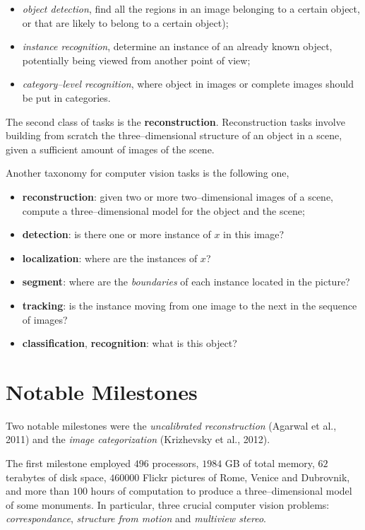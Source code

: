 \documentclass[10pt]{report}
\begin{document}
\begin{itemize}
\item \emph{object detection}, find all the regions in an image belonging to a certain object, or that are likely to belong to a certain object);
\item \emph{instance recognition}, determine an instance of an already known object, potentially being viewed from another point of view;
\item \emph{category--level recognition}, where object in images or complete images should be put in categories.
\end{itemize}

The second class of tasks is the \textbf{reconstruction}. Reconstruction tasks involve
building from scratch the three--dimensional structure of an object in a scene,
given a sufficient amount of images of the scene.

Another taxonomy for computer vision tasks is the following one,

\begin{itemize}
\item \textbf{reconstruction}: given two or more two--dimensional images of a scene, compute a three--dimensional model for the object and the scene;
\item \textbf{detection}: is there one or more instance of \(x\) in this image?
\item \textbf{localization}: where are the instances of \(x\)?
\item \textbf{segment}: where are the \emph{boundaries} of each instance located in the picture?
\item \textbf{tracking}: is the instance moving from one image to the next in the sequence of images?
\item \textbf{classification}, \textbf{recognition}: what is this object?
\end{itemize}


\section{Notable Milestones}
\label{notable-milestones}
Two notable milestones were the \emph{uncalibrated reconstruction} (Agarwal et
al., 2011) and the \emph{image categorization} (Krizhevsky et al., 2012).

The first milestone employed \(496\) processors, \(1984\) GB of total memory, \(62\)
terabytes of disk space, \(460000\) Flickr pictures of Rome, Venice and Dubrovnik,
and more than \(100\) hours of computation to produce a three--dimensional model
of some monuments. In particular, three crucial computer vision problems:
\emph{correspondance}, \emph{structure from motion} and \emph{multiview stereo}.
\end{document}
